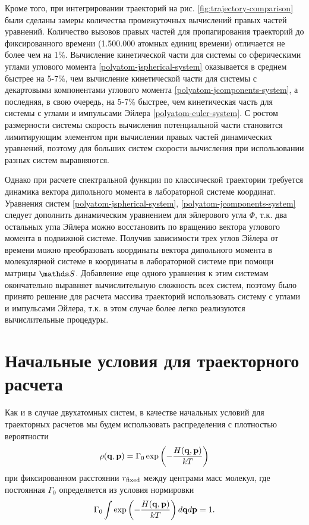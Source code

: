 Кроме того, при интегрировании траекторий на рис. \ref{fig:trajectory-comparison} были сделаны замеры количества промежуточных вычислений правых частей уравнений. Количество вызовов правых частей для пропагирования траекторий до фиксированного времени (1.500.000 атомных единиц времени) отличается не более чем на 1\%. Вычисление кинетической части для системы со сферическими углами углового момента \eqref{polyatom-jspherical-system} оказывается в среднем быстрее на 5-7\%, чем вычисление кинетической части для системы с декартовыми компонентами углового момента \eqref{polyatom-jcomponents-system}, а последняя, в свою очередь, на 5-7\% быстрее, чем кинетическая часть для системы с углами и импульсами Эйлера \eqref{polyatom-euler-system}. С ростом размерности системы скорость вычисления потенциальной части становится лимитирующим элементом при вычислении правых частей динамических уравнений, поэтому для больших систем скорости вычисления при использовании разных систем выравняются. \par
Однако при расчете спектральной функции по классической траектории требуется динамика вектора дипольного момента в лабораторной системе координат. Уравнения систем \eqref{polyatom-jspherical-system}, \eqref{polyatom-jcomponents-system} следует дополнить динамическим уравнением для эйлерового угла $\Phi$, т.к. два остальных угла Эйлера можно восстановить по вращению вектора углового момента в подвижной системе. Получив зависимости трех углов Эйлера от времени можно преобразовать координаты вектора дипольного момента в молекулярной системе в координаты в лабораторной системе при помощи матрицы $\bbS$. Добавление еще одного уравнения к этим системам окончательно выравняет вычислительную сложность всех систем, поэтому было принято решение для расчета массива траекторий использовать систему с углами и импульсами Эйлера, т.к. в этом случае более легко реализуются вычислительные процедуры.

\section{Начальные условия для траекторного расчета}

Как и в случае двухатомных систем, в качестве начальных условий для траекторных расчетов мы будем использовать распределения с плотностью вероятности
\begin{gather}
    \rho(\mathbf{q}, \mathbf{p}) = \Gamma_0 \exp \left( -\frac{H(\mathbf{q}, \mathbf{p})}{kT} \right)
\end{gather}
%
при фиксированном расстоянии $r_\text{fixed}$ между центрами масс молекул, где постоянная $\Gamma_0$ определяется из условия нормировки
\begin{gather}
    \Gamma_0 \int \exp \left( -\frac{H(\mathbf{q}, \mathbf{p})}{k T} \right) d \mathbf{q} d\mathbf{p} = 1.
\end{gather}

